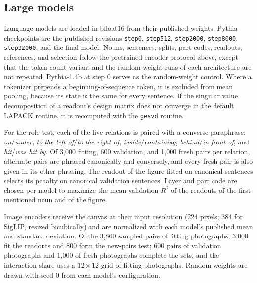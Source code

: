 \documentclass[10pt]{article}
\theoremstyle{plain}
\theoremstyle{remark}
\begin{document}
\subsection{Large models}
Language models are loaded in bfloat16 from their published weights; Pythia checkpoints are the published revisions \texttt{step0}, \texttt{step512}, \texttt{step2000}, \texttt{step8000}, \texttt{step32000}, and the final model. Nouns, sentences, splits, part codes, readouts, references, and selection follow the pretrained-encoder protocol above, except that the token-count variant and the random-weight runs of each architecture are not repeated; Pythia-1.4b at step 0 serves as the random-weight control. Where a tokenizer prepends a beginning-of-sequence token, it is excluded from mean pooling, because its state is the same for every sentence. If the singular value decomposition of a readout's design matrix does not converge in the default LAPACK routine, it is recomputed with the \texttt{gesvd} routine.

For the role test, each of the five relations is paired with a converse paraphrase: \emph{on}/\emph{under}, \emph{to the left of}/\emph{to the right of}, \emph{inside}/\emph{containing}, \emph{behind}/\emph{in front of}, and \emph{hit}/\emph{was hit by}. Of 3{,}000 fitting, 600 validation, and 1{,}000 fresh pairs per relation, alternate pairs are phrased canonically and conversely, and every fresh pair is also given in its other phrasing. The readout of the figure fitted on canonical sentences selects its penalty on canonical validation sentences. Layer and part code are chosen per model to maximize the mean validation $R^2$ of the readouts of the first-mentioned noun and of the figure.

Image encoders receive the canvas at their input resolution (224 pixels; 384 for SigLIP, resized bicubically) and are normalized with each model's published mean and standard deviation. Of the 3{,}800 sampled pairs of fitting photographs, 3{,}000 fit the readouts and 800 form the new-pairs test; 600 pairs of validation photographs and 1{,}000 of fresh photographs complete the sets, and the interaction share uses a $12 \times 12$ grid of fitting photographs. Random weights are drawn with seed 0 from each model's configuration.
\end{document}
